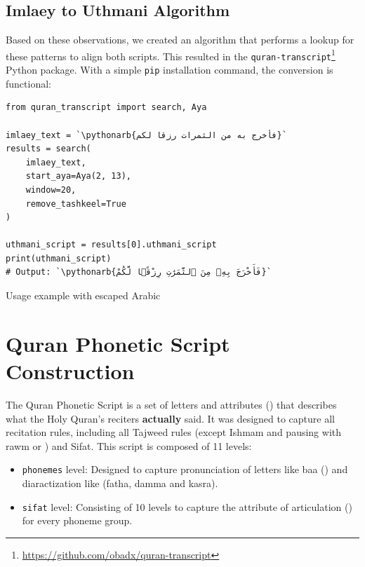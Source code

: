 \subsection{Imlaey to Uthmani Algorithm}

Based on these observations, we created an algorithm that performs a lookup for these patterns to align both scripts. This resulted in the \texttt{quran-transcript}\footnote{\url{https://github.com/obadx/quran-transcript}} Python package. With a simple \texttt{pip} installation command, the conversion is functional:


\begin{listing}[H]
\begin{verbatim}
from quran_transcript import search, Aya

imlaey_text = `\pythonarb{فأخرج به من الثمرات رزقا لكم}`
results = search(
    imlaey_text,
    start_aya=Aya(2, 13),
    window=20,
    remove_tashkeel=True
)

uthmani_script = results[0].uthmani_script
print(uthmani_script)
# Output: `\pythonarb{فَأَخْرَجَ بِهِۦ مِنَ ٱلثَّمَرَٰتِ رِزْقًۭا لَّكُمْ}`
\end{verbatim}
\caption{Usage example with escaped Arabic}
\label{code:example-escaped}
\end{listing}






\section{Quran Phonetic Script Construction}

The Quran Phonetic Script is a set of letters and attributes () that describes what the Holy Quran's reciters \textbf{actually} said. It was designed to capture all recitation rules, including all Tajweed rules (except Ishmam  and pausing with rawm  or ) and Sifat. This script is composed of 11 levels:

\begin{itemize}
\item \texttt{phonemes} level: Designed to capture pronunciation of letters like baa () and diaractization like (fatha, damma and kasra).
\item \texttt{sifat} level: Consisting of 10 levels to capture the attribute of articulation () for every phoneme group.
\end{itemize}

